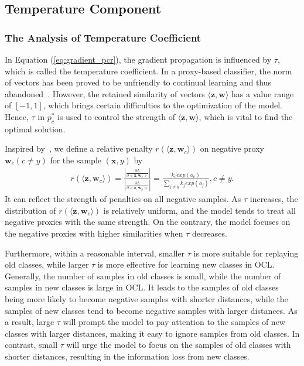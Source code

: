\subsection{Temperature Component}

\subsubsection{The Analysis of Temperature Coefficient}
In Equation (\ref{eq:gradient_pcr}), the gradient propagation is influenced by $\tau$, which is called the temperature coefficient. In a proxy-based classifier, the norm of vectors has been proved to be unfriendly to continual learning and thus abandoned~\cite{hou2019learning}. However, the retained similarity of vectors $\langle\bm{z},\bm{w}\rangle$ has a value range of $[-1,1]$, which brings certain difficulties to the optimization of the model. Hence, $\tau$ in $p^*_c$ is used to control the strength of $\langle\bm{z},\bm{w}\rangle$, which is vital to find the optimal solution. 

Inspired by~\cite{wang2021understanding}, we define a relative penalty $r(\langle\bm{z},\bm{w}_c\rangle)$ on negative proxy $\bm{w}_c(c\neq y)$ for the sample $(\bm{x},y)$ by
\begin{equation}
    \begin{split}
    r(\langle\bm{z},\bm{w}_c\rangle)=\frac{|\frac{\partial L}{\partial <\bm{z},\bm{w}_c>}|}{|\frac{\partial L}{\partial <\bm{z},\bm{w}_y>}|}=\frac{k_cexp(o_c)}{\sum_{j\neq y}k_jexp(o_j)}, c\neq y.
    \end{split}
\end{equation}
It can reflect the strength of penalties on all negative samples. As $\tau$ increases, the distribution of $r(\langle\bm{z},\bm{w}_c\rangle)$ is relatively uniform, and the model tends to treat all negative proxies with the same strength. On the contrary, the model focuses on the negative proxies with higher similarities when $\tau$ decreases.

Furthermore, within a reasonable interval, smaller $\tau$ is more suitable for replaying old classes, while larger $\tau$ is more effective for learning new classes in OCL. Generally, the number of samples in old classes is small, while the number of samples in new classes is large in OCL. It leads to the samples of old classes being more likely to become negative samples with shorter distances, while the samples of new classes tend to become negative samples with larger distances. As a result, large $\tau$ will prompt the model to pay attention to the samples of new classes with larger distances, making it easy to ignore samples from old classes. In contrast, small $\tau$ will urge the model to focus on the samples of old classes with shorter distances, resulting in the information loss from new classes.

